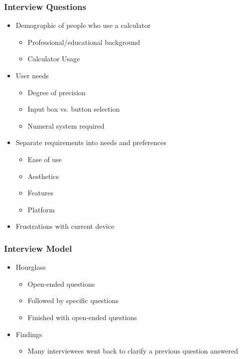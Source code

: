 \documentclass{beamer}
\begin{document}
\begin{frame}
\frametitle{Interview Questions}
\begin{itemize}
 \item Demographic of people who use a calculator
  \begin{itemize}
   \item Professional/educational background
   \item Calculator Usage
  \end{itemize}
 \item User needs
  \begin{itemize}
   \item Degree of precision
   \item Input box vs. button selection
   \item Numeral system required
  \end{itemize}
 \item Separate requirements into needs and preferences
  \begin{itemize}
   \item Ease of use
   \item Aesthetics
   \item Features
   \item Platform
  \end{itemize}
   \item Frustrations with current device
\end{itemize}
\end{frame}


\begin{frame}
\frametitle{Interview Model}
\begin{itemize}
 \item Hourglass
   \begin{itemize}
   \item Open-ended questions
   \item Followed by specific questions
   \item Finished with open-ended questions
  \end{itemize}
 \item Findings
  \begin{itemize}
   \item Many interviewees went back to clarify a previous question answered
  \end{itemize}
\end{itemize}
\end{frame}
\end{document}
